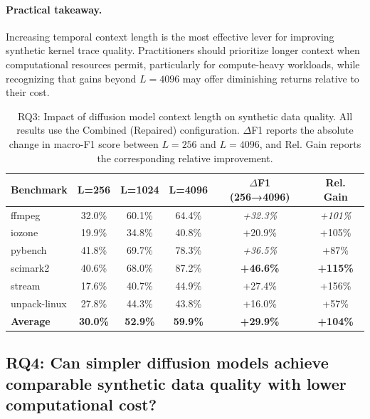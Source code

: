 \paragraph{Practical takeaway.}
Increasing temporal context length is the most effective lever for improving synthetic kernel trace quality. Practitioners should prioritize longer context when computational resources permit, particularly for compute-heavy workloads, while recognizing that gains beyond $L=4096$ may offer diminishing returns relative to their cost.


\begin{table}[t]
\centering
\caption{RQ3: Impact of diffusion model context length on synthetic data quality. All results use the Combined (Repaired) configuration. $\Delta$F1 reports the absolute change in macro-F1 score between $L=256$ and $L=4096$, and Rel. Gain reports the corresponding relative improvement.}

\label{tab:rq3}
\footnotesize
\setlength{\tabcolsep}{4pt}
\begin{tabular}{@{}lccccc@{}}
\toprule
\textbf{Benchmark} & \textbf{L=256} & \textbf{L=1024} & \textbf{L=4096} & \textbf{$\Delta$F1 (256→4096)} & \textbf{Rel. Gain} \\
\midrule
ffmpeg       & 32.0\% & 60.1\% & 64.4\% & \textit{+32.3\%} & \textit{+101\%} \\
iozone       & 19.9\% & 34.8\% & 40.8\% & +20.9\% & +105\% \\
pybench      & 41.8\% & 69.7\% & 78.3\% & \textit{+36.5\%} & +87\% \\
scimark2     & 40.6\% & 68.0\% & 87.2\% & \textbf{+46.6\%} & \textbf{+115\%} \\
stream       & 17.6\% & 40.7\% & 44.9\% & +27.4\% & +156\% \\
unpack-linux & 27.8\% & 44.3\% & 43.8\% & +16.0\% & +57\% \\
\midrule
\textbf{Average} & \textbf{30.0\%} & \textbf{52.9\%} & \textbf{59.9\%} & \textbf{+29.9\%} & \textbf{+104\%} \\
\bottomrule
\end{tabular}
\end{table}




\subsection{RQ4: Can simpler diffusion models achieve comparable synthetic data quality with lower computational cost?}
\label{sec:rq4}

